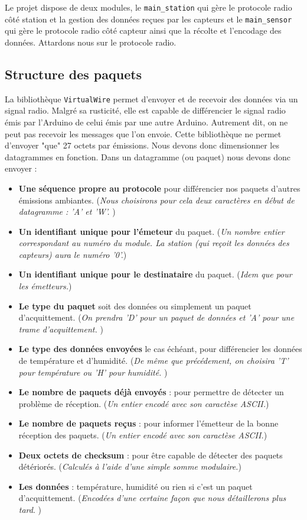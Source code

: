 \documentclass[a4paper]{article}
\begin{document}
Le projet dispose de deux modules, le \texttt{main\_station} qui gère le protocole radio côté station et 
la gestion des données reçues par les capteurs et le \texttt{main\_sensor} qui gère le protocole radio côté 
capteur ainsi que la récolte et l'encodage des données. Attardons nous sur le protocole radio. 

\subsection{Structure des paquets}

La bibliothèque \texttt{VirtualWire} permet d'envoyer et de recevoir des données via un signal radio.
Malgré sa rusticité, elle est capable de différencier le signal radio émis par l'Arduino de celui émis par une 
autre Arduino. Autrement dit, on ne peut pas recevoir les messages que l'on envoie. 
Cette bibliothèque ne permet d'envoyer "que" 27 octets par émissions. Nous devons donc dimensionner les datagrammes en fonction. 
Dans un datagramme (ou paquet) nous devons donc envoyer : 
\begin{itemize}
    \item \textbf{Une séquence propre au protocole} pour différencier nos paquets d'autres émissions ambiantes. 
        (\emph{Nous choisirons pour cela deux caractères en début de datagramme : 'A' et 'W'. })
    \item \textbf{Un identifiant unique pour l'émeteur} du paquet. 
        (\emph{Un nombre entier correspondant au numéro du module. La station (qui reçoit les données 
        des capteurs) aura le numéro '0'.})
    \item \textbf{Un identifiant unique pour le destinataire} du paquet. 
        (\emph{Idem que pour les émetteurs.})
    \item \textbf{Le type du paquet} soit des données ou simplement un paquet d'acquittement. 
        (\emph{On prendra 'D' pour un paquet de données et 'A' pour une trame d'acquittement. })
    \item \textbf{Le type des données envoyées} le cas échéant, pour différencier les données de température et d'humidité. 
        (\emph{De même que précédement, on choisira 'T' pour température ou 'H' pour humidité. })
    \item \textbf{Le nombre de paquets déjà envoyés} : pour permettre de détecter un problème de réception. 
        (\emph{Un entier encodé avec son caractèse ASCII.})
    \item \textbf{Le nombre de paquets reçus} : pour informer l'émetteur de la bonne réception des paquets. 
        (\emph{Un entier encodé avec son caractèse ASCII.})
    \item \textbf{Deux octets de checksum }: pour être capable de détecter des paquets détériorés. 
        (\emph{Calculés à l'aide d'une simple somme modulaire.})
    \item \textbf{Les données} : température, humidité ou rien si c'est un paquet d'acquittement. 
        (\emph{Encodées d'une certaine façon que nous détaillerons plus tard}. )
\end{itemize}
\end{document}

